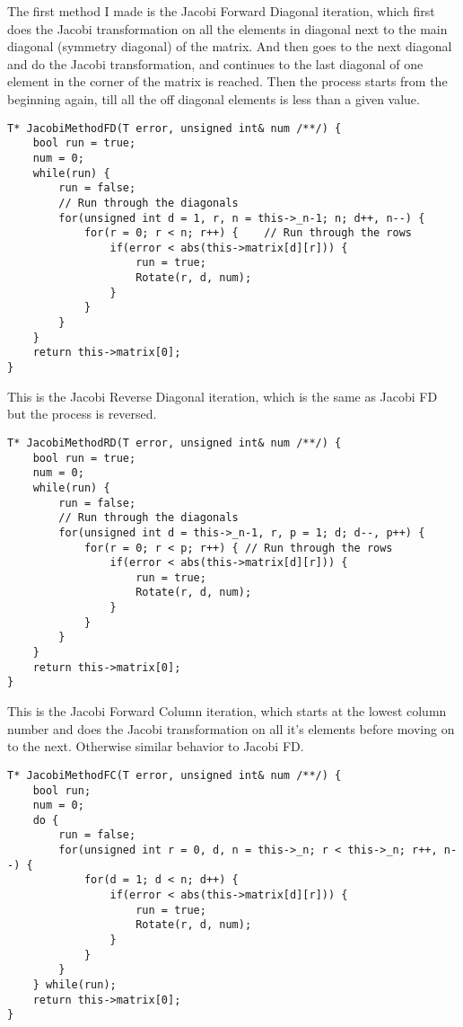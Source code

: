 \documentclass[11pt,english,a4paper]{article}
\begin{document}
\begin{flushleft}
The first method I made is the Jacobi Forward Diagonal iteration, which first does the Jacobi transformation on all the elements in diagonal next to the main diagonal (symmetry diagonal) of the matrix. And then goes to the next diagonal and do the Jacobi transformation, and continues to the last diagonal of one element in the corner of the matrix is reached. Then the process starts from the beginning again, till all the off diagonal elements is less than a given value.

\begin{lstlisting}[title={\texttt{Matrix<MatrixType::Symmetric, T>::JacobiMethodFD}}]
T* JacobiMethodFD(T error, unsigned int& num /**/) {
	bool run = true;
	num = 0;
	while(run) {
		run = false;
		// Run through the diagonals
		for(unsigned int d = 1, r, n = this->_n-1; n; d++, n--) {   
			for(r = 0; r < n; r++) {	// Run through the rows
				if(error < abs(this->matrix[d][r])) {
					run = true;
					Rotate(r, d, num);
				}
			}
		}
	}
	return this->matrix[0];
}
\end{lstlisting}


This is the Jacobi Reverse Diagonal iteration, which is the same as Jacobi FD but the process is reversed.

\begin{lstlisting}[title={\texttt{Matrix<MatrixType::Symmetric, T>::JacobiMethodRD}}]
T* JacobiMethodRD(T error, unsigned int& num /**/) {
	bool run = true;
	num = 0;
	while(run) {
		run = false;
		// Run through the diagonals
		for(unsigned int d = this->_n-1, r, p = 1; d; d--, p++) {   
			for(r = 0; r < p; r++) { // Run through the rows
				if(error < abs(this->matrix[d][r])) {
					run = true;
					Rotate(r, d, num);
				}
			}
		}
	}
	return this->matrix[0];
}
\end{lstlisting}


This is the Jacobi Forward Column iteration, which starts at the lowest column number and does the Jacobi transformation on all it's elements before moving on to the next. Otherwise similar behavior to Jacobi FD.

\begin{lstlisting}[title={\texttt{Matrix<MatrixType::Symmetric, T>::JacobiMethodFC}}]
T* JacobiMethodFC(T error, unsigned int& num /**/) {
	bool run;
	num = 0;
	do {
		run = false;
		for(unsigned int r = 0, d, n = this->_n; r < this->_n; r++, n--) {
			for(d = 1; d < n; d++) {
				if(error < abs(this->matrix[d][r])) {
					run = true;
					Rotate(r, d, num);
				}
			}
		}
	} while(run);
	return this->matrix[0];
}
\end{lstlisting}


\end{flushleft}
\end{document}

